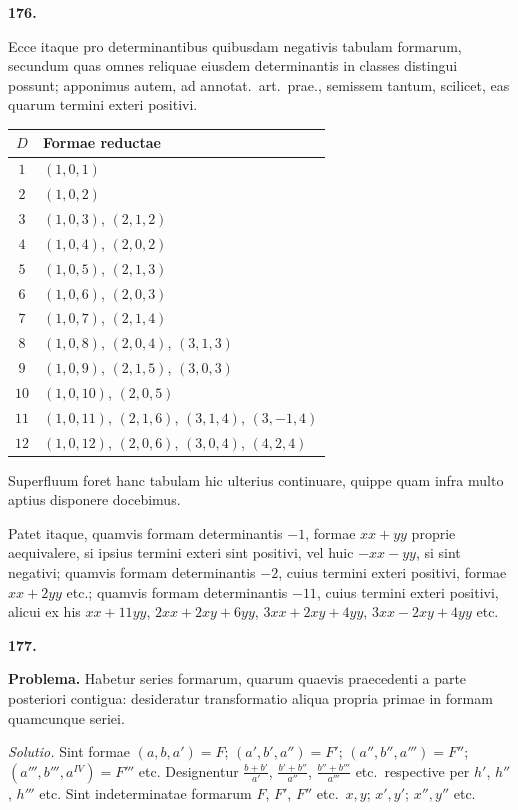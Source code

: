\documentclass[12pt,a4paper]{article}
\theoremstyle{plain}
\begin{document}
\bigskip

\textbf{176.}

Ecce itaque pro determinantibus quibusdam negativis tabulam formarum, secundum quas omnes reliquae eiusdem determinantis in classes distingui possunt; apponimus autem, ad annotat.~art.~prae., semissem tantum, scilicet, eas quarum termini exteri positivi.

\begin{center}
\begin{tabular}{cl}
$D$ & \quad Formae reductae \\ \hline
\rule{0pt}{2.5ex}%
$1$ & $(1,0,1)$ \\
$2$ & $(1,0,2)$ \\
$3$ & $(1,0,3)$, $(2,1,2)$ \\
$4$ & $(1,0,4)$, $(2,0,2)$ \\
$5$ & $(1,0,5)$, $(2,1,3)$ \\
$6$ & $(1,0,6)$, $(2,0,3)$ \\
$7$ & $(1,0,7)$, $(2,1,4)$ \\
$8$ & $(1,0,8)$, $(2,0,4)$, $(3,1,3)$ \\
$9$ & $(1,0,9)$, $(2,1,5)$, $(3,0,3)$ \\
$10$ & $(1,0,10)$, $(2,0,5)$ \\
$11$ & $(1,0,11)$, $(2,1,6)$, $(3,1,4)$, $(3,-1,4)$ \\
$12$ & $(1,0,12)$, $(2,0,6)$, $(3,0,4)$, $(4,2,4)$ \\
\end{tabular}
\end{center}

Superfluum foret hanc tabulam hic ulterius continuare, quippe quam infra multo aptius disponere docebimus.

Patet itaque, quamvis formam determinantis $-1$, formae $xx + yy$ proprie aequivalere, si ipsius termini exteri sint positivi, vel huic $-xx - yy$, si sint negativi; quamvis formam determinantis $-2$, cuius termini exteri positivi, formae $xx + 2yy$ etc.; quamvis formam determinantis $-11$, cuius termini exteri positivi, alicui ex his $xx + 11yy$, $2xx + 2xy + 6yy$, $3xx + 2xy + 4yy$, $3xx - 2xy + 4yy$ etc.

\bigskip

\textbf{177.}

\textbf{Problema.} Habetur series formarum, quarum quaevis praecedenti a parte posteriori contigua: desideratur transformatio aliqua propria primae in formam quamcunque seriei.

\textit{Solutio.} Sint formae $(a,b,a') = F$; $(a',b',a'') = F'$; $(a'',b'',a''') = F''$; $(a''',b''',a^{IV}) = F'''$ etc. Designentur $\frac{b+b'}{a'}$, $\frac{b'+b''}{a''}$, $\frac{b''+b'''}{a'''}$ etc.~respective per $h'$, $h''$, $h'''$ etc. Sint indeterminatae formarum $F$, $F'$, $F''$ etc.~$x,y$; $x',y'$; $x'',y''$ etc.
\end{document}
